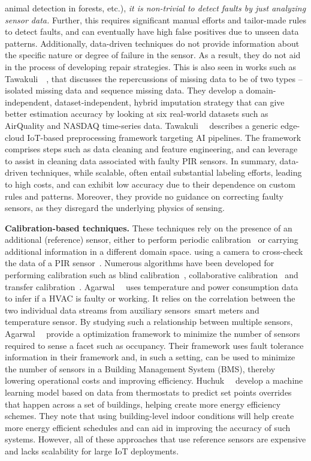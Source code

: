 animal detection in forests, etc.), \textit{it is non-trivial to detect faults by just analyzing sensor data.} Further, this requires significant manual efforts and tailor-made rules to detect faults, and can eventually have high false positives due to unseen data patterns. Additionally, data-driven techniques do not provide information about the specific nature or degree of failure in the sensor. As a result, they do not aid in the process of developing repair strategies. This is also seen in works such as Tawakuli~\etal~\cite{tawakuli2023experience}, that discusses the repercussions of missing data to be of two types -- \ca isolated missing data and \cb sequence missing data. They develop a domain-independent, dataset-independent, hybrid imputation strategy that can give better estimation accuracy by looking at six real-world datasets such as AirQuality and NASDAQ time-series data. Tawakuli~\etal~\cite{Tawakuli2022TransformingID} describes a generic edge-cloud IoT-based preprocessing framework targeting AI pipelines. The framework comprises steps such as data cleaning and feature engineering, and can leverage \sol to assist in cleaning data associated with faulty PIR sensors. In summary, data-driven techniques, while scalable, often entail substantial labeling efforts, leading to high costs, and can exhibit low accuracy due to their dependence on custom rules and patterns. Moreover, they provide no guidance on correcting faulty sensors, as they disregard the underlying physics of sensing.

\textbf{Calibration-based techniques.} These techniques rely on the presence of an additional (reference) sensor, either to perform periodic calibration~\cite{whitehouse2002calibration, 8405565} or carrying additional information in a different domain space.  \Eg using a camera to cross-check the data of a PIR sensor~\cite{tang2017occupancy}. Numerous algorithms have been developed for performing calibration such as blind calibration~\cite{7472216, 7495010}, collaborative calibration~\cite{10.1145/2737095.2737113, 10.1145/2185677.2185687} and transfer calibration~\cite{article_nose}. Agarwal~\etal~\cite{Agarwal2021ANA} uses temperature and power consumption data to infer if a HVAC is faulty or working. It relies on the correlation between the two individual data streams from auxiliary sensors~\viz smart meters and temperature sensor. By studying such a relationship between multiple sensors, Agarwal~\etal~\cite{Agarwal2022ANA} provide a optimization framework to minimize the number of sensors required to sense a facet such as occupancy. Their framework uses fault tolerance information in their framework and, in such a setting, \sol can be used to minimize the number of sensors in a Building Management System (BMS), thereby lowering operational costs and improving efficiency. Huchuk~\etal~\cite{huchuk2021data} develop a machine learning model based on data from thermostats to predict set points overrides that happen across a set of buildings, helping create more energy efficiency schemes. They note that using building-level indoor conditions will help create more energy efficient schedules and \sol can aid in improving the accuracy of such systems. However, all of these approaches that use reference sensors are expensive and lacks scalability for large IoT deployments. %

